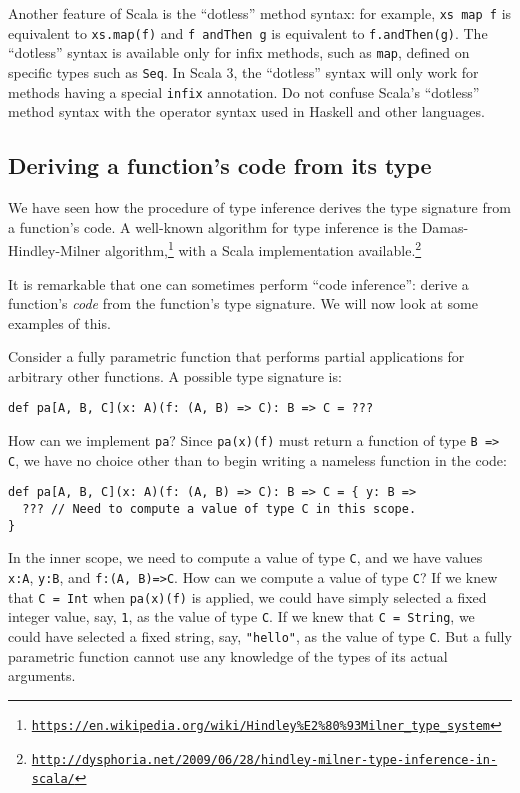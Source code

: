 Another feature of Scala is the \textsf{``}dotless\textsf{''} method syntax: for example,
\lstinline!xs map f! is equivalent to \lstinline!xs.map(f)! and
\lstinline!f andThen g! is equivalent to \lstinline!f.andThen(g)!.
The \textsf{``}dotless\textsf{''} syntax is available only for infix methods, such
as \lstinline!map!, defined on specific types such as \lstinline!Seq!.
In Scala 3, the \textsf{``}dotless\textsf{''} syntax will only work for methods having
a special \lstinline!infix! annotation. Do not confuse Scala\textsf{'}s \textsf{``}dotless\textsf{''}
method syntax with the operator syntax used in Haskell and other languages.

\subsection{Deriving a function\textsf{'}s code from its type\label{subsec:Deriving-a-function-s-code}}

We have seen how the procedure of type inference
derives the type signature from a function\textsf{'}s code. A well-known algorithm
for type inference is the Damas-Hindley-Milner algorithm,\footnote{\texttt{\href{https://en.wikipedia.org/wiki/Hindley\%E2\%80\%93Milner_type_system}{https://en.wikipedia.org/wiki/Hindley\%E2\%80\%93Milner\_type\_system}}}
with a Scala implementation available.\footnote{\texttt{\href{http://dysphoria.net/2009/06/28/hindley-milner-type-inference-in-scala/}{http://dysphoria.net/2009/06/28/hindley-milner-type-inference-in-scala/}}}

It is remarkable that one can sometimes perform \textsf{``}code
inference\textsf{''}: derive a function\textsf{'}s \emph{code} from the function\textsf{'}s
type signature. We will now look at some examples of this.

Consider a fully parametric function that performs partial applications
for arbitrary other functions. A possible type signature is:
\begin{lstlisting}
def pa[A, B, C](x: A)(f: (A, B) => C): B => C = ???
\end{lstlisting}

How can we implement \lstinline!pa!? Since \lstinline!pa(x)(f)!
must return a function of type \lstinline!B => C!, we have no choice
other than to begin writing a nameless function in the code:
\begin{lstlisting}
def pa[A, B, C](x: A)(f: (A, B) => C): B => C = { y: B =>
  ??? // Need to compute a value of type C in this scope.
}
\end{lstlisting}
In the inner scope, we need to compute a value of type \lstinline!C!,
and we have values \lstinline!x:A!, \lstinline!y:B!, and \lstinline!f:(A, B)=>C!.
How can we compute a value of type \lstinline!C!? If we knew that
\lstinline!C = Int! when \lstinline!pa(x)(f)! is applied, we could
have simply selected a fixed integer value, say, \lstinline!1!, as
the value of type \lstinline!C!. If we knew that \lstinline!C = String!,
we could have selected a fixed string, say, \lstinline!"hello"!,
as the value of type \lstinline!C!. But a fully parametric function
cannot use any knowledge of the types of its actual arguments.

